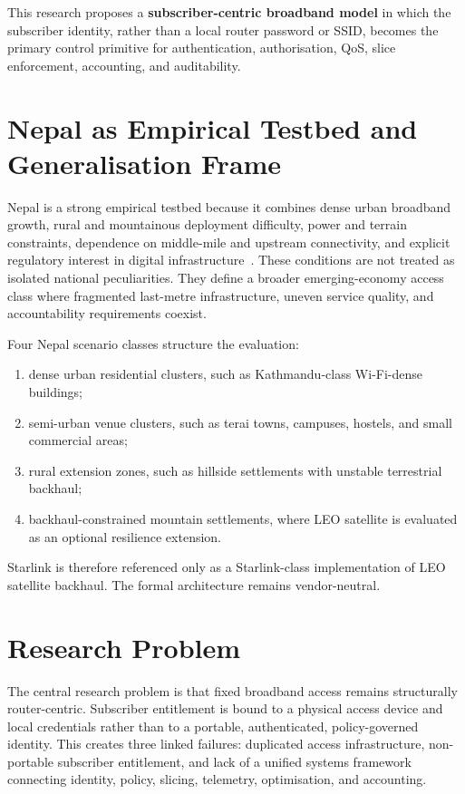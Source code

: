 This research proposes a \textbf{subscriber-centric broadband model} in which the subscriber identity, rather than a local router password or SSID, becomes the primary control primitive for authentication, authorisation, QoS, slice enforcement, accounting, and auditability.

\section{Nepal as Empirical Testbed and Generalisation Frame}
\label{sec:nepal}

Nepal is a strong empirical testbed because it combines dense urban broadband growth, rural and mountainous deployment difficulty, power and terrain constraints, dependence on middle-mile and upstream connectivity, and explicit regulatory interest in digital infrastructure~\cite{worldbank-digitalnepal2022,nta-mis2024}. These conditions are not treated as isolated national peculiarities. They define a broader emerging-economy access class where fragmented last-metre infrastructure, uneven service quality, and accountability requirements coexist.

Four Nepal scenario classes structure the evaluation:
\begin{enumerate}
  \item dense urban residential clusters, such as Kathmandu-class Wi-Fi-dense buildings;
  \item semi-urban venue clusters, such as terai towns, campuses, hostels, and small commercial areas;
  \item rural extension zones, such as hillside settlements with unstable terrestrial backhaul;
  \item backhaul-constrained mountain settlements, where LEO satellite is evaluated as an optional resilience extension.
\end{enumerate}

Starlink is therefore referenced only as a Starlink-class implementation of LEO satellite backhaul. The formal architecture remains vendor-neutral.

\section{Research Problem}
\label{sec:problem}

The central research problem is that fixed broadband access remains structurally router-centric. Subscriber entitlement is bound to a physical access device and local credentials rather than to a portable, authenticated, policy-governed identity. This creates three linked failures: duplicated access infrastructure, non-portable subscriber entitlement, and lack of a unified systems framework connecting identity, policy, slicing, telemetry, optimisation, and accounting.

